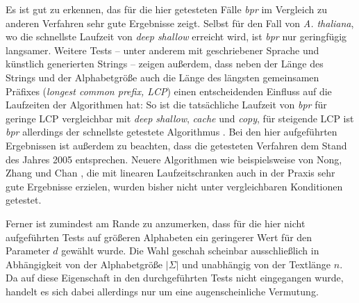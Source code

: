 Es ist gut zu erkennen, das für die hier getesteten Fälle \emph{bpr} im Vergleich zu anderen Verfahren sehr gute Ergebnisse zeigt. Selbst für den Fall von \emph{A. thaliana}, wo die schnellste Laufzeit von \emph{deep shallow} erreicht wird, ist \emph{bpr} nur geringfügig langsamer. Weitere Tests -- unter anderem mit geschriebener Sprache und künstlich generierten Strings -- zeigen außerdem, dass neben der Länge des Strings und der Alphabetgröße auch die Länge des längsten gemeinsamen Präfixes (\emph{longest common prefix, LCP}) einen entscheidenden Einfluss auf die Laufzeiten der Algorithmen hat: So ist die tatsächliche Laufzeit von \emph{bpr} für geringe LCP vergleichbar mit \emph{deep shallow}, \emph{cache} und \emph{copy}, für steigende LCP ist \emph{bpr} allerdings der schnellste getestete Algorithmus \cite[Kapitel~4]{schuermann2005}. Bei den hier aufgeführten Ergebnissen ist außerdem zu beachten, dass die getesteten Verfahren dem Stand des Jahres 2005 entsprechen. Neuere Algorithmen wie beispielsweise von Nong, Zhang und Chan \cite{saca:6}, die mit linearen Laufzeitschranken auch in der Praxis sehr gute Ergebnisse erzielen, wurden bisher nicht unter vergleichbaren Konditionen getestet.\par\smallskip
Ferner ist zumindest am Rande zu anzumerken, dass für die hier nicht aufgeführten Tests auf größeren Alphabeten ein geringerer Wert für den Parameter \(d\) gewählt wurde. Die Wahl geschah scheinbar ausschließlich in Abhängigkeit von der Alphabetgröße \(|\Sigma|\) und unabhängig von der Textlänge \(n\). Da auf diese Eigenschaft in den durchgeführten Tests nicht eingegangen wurde, handelt es sich dabei allerdings nur um eine augenscheinliche Vermutung.
